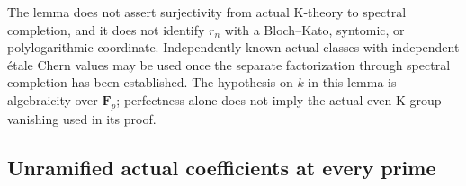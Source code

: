 \begin{remark}
The lemma does not assert surjectivity from actual K-theory to
spectral completion, and it does not identify $r_n$ with a
Bloch--Kato, syntomic, or polylogarithmic coordinate. Independently
known actual classes with independent \'etale Chern values may be
used once the separate factorization through spectral completion
has been established. The hypothesis on $k$ in this lemma is
algebraicity over $\mathbf F_p$; perfectness alone does not imply
the actual even K-group vanishing used in its proof.
\end{remark}


\subsection{Unramified actual coefficients at every prime}
\label{d3:sec:unramifiedhighercoefficients}

